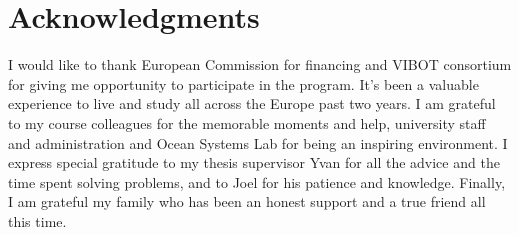 \tableofcontents

\listoffigures
\listoftables

\chapter*{Acknowledgments}
         {\protect{}}

I would like to thank European Commission for financing and VIBOT consortium for giving me opportunity to participate in the program. It's been a valuable experience to live and study all across the Europe past two years. I am grateful to my course colleagues for the memorable moments and help, university staff and administration and Ocean Systems Lab for being an inspiring environment. I express special gratitude to my thesis supervisor Yvan for all the advice and the time spent solving problems,  and to Joel for his patience and knowledge.  
Finally, I am grateful my family who has been an honest support and a true friend all this time.       
\pagestyle{fancy}
